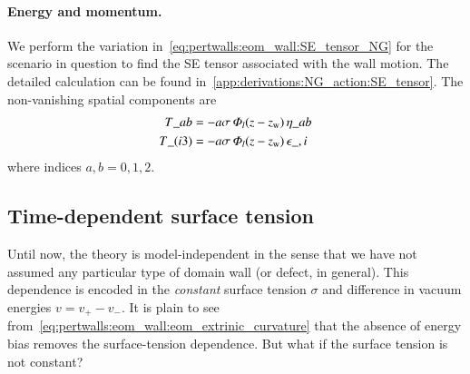 \paragraph{Energy and momentum.} %
    We perform the variation in~\cref{eq:pertwalls:eom_wall:SE_tensor_NG} for the scenario in question to find the SE tensor associated with the wall motion. The detailed calculation can be found in~\cref{app:derivations:NG_action:SE_tensor}. The non-vanishing spatial components are
    \begin{equation}\label{eq:pertwalls:thinwall:SE_tensor}
        \begin{split}
            T\_{ab}&=  -a \sigma \, \varPhi_l(z-z\ped{w}) \, \eta\_{ab} \\
            T\_{(i3)}&= -a \sigma \,\varPhi_l(z-z\ped{w} ) \,\epsilon\_{,i} %
        \end{split}
    \end{equation}
    where indices $a,b=0,1,2$.






\subsection{Time-dependent surface tension}
    Until now, the theory is model-independent in the sense that we have not assumed any particular type of domain wall (or defect, in general). This dependence is encoded in the \emph{constant} surface tension $\sigma$ and difference in vacuum energies $v=v_+-v_-$. %
    It is plain to see from~\cref{eq:pertwalls:eom_wall:eom_extrinic_curvature} that the absence of energy bias removes the surface-tension dependence. %
    But what if the surface tension is not constant? 
    


